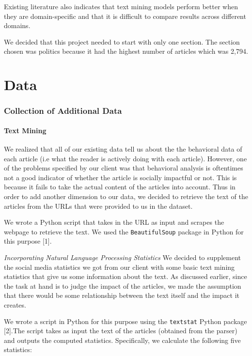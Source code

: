 \documentclass[10pt,letterpaper]{article}
\begin{document}
Existing literature also indicates that text mining models perform
better when they are domain-specific and that it is difficult to compare
results across different domains.

We decided that this project needed to start with only one section. The
section chosen was politics because it had the highest number of
articles which was 2,794.

\hypertarget{data}{%
\section{Data}\label{data}}

\hypertarget{collection-of-additional-data}{%
\subsubsection{Collection of Additional
Data}\label{collection-of-additional-data}}

\hypertarget{text-mining}{%
\paragraph{Text Mining}\label{text-mining}}

We realized that all of our existing data tell us about the the
behavioral data of each article (i.e what the reader is actively doing
with each article). However, one of the problems specified by our client
was that behavioral analysis is oftentimes not a good indicator of
whether the article is socially impactful or not. This is because it
fails to take the actual content of the articles into account. Thus in
order to add another dimension to our data, we decided to retrieve the
text of the articles from the URLs that were provided to us in the
dataset.

We wrote a Python script that takes in the URL as input and scrapes the
webpage to retrieve the text. We used the \texttt{BeautifulSoup} package
in Python for this purpose {[}1{]}.

\emph{Incorporating Natural Language Processing Statistics} We decided
to supplement the social media statistics we got from our client with
some basic text mining statistics that give us some information about
the text. As discussed earlier, since the task at hand is to judge the
impact of the articles, we made the assumption that there would be some
relationship between the text itself and the impact it creates.

We wrote a script in Python for this purpose using the \texttt{textstat}
Python package {[}2{]}.The script takes as input the text of the
articles (obtained from the parser) and outputs the computed statistics.
Specifically, we calculate the following five statistics:
\end{document}
